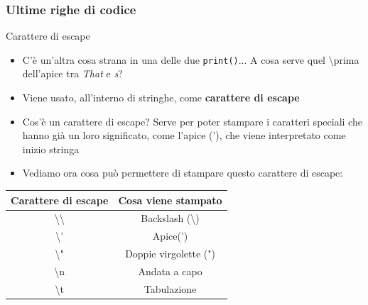 \documentclass{beamer}
\begin{document}
\begin{frame}[fragile]
\frametitle{Ultime righe di codice}
	\begin{block}{Carattere di escape}
	\begin{itemize}
		\item C'è un'altra cosa strana in una delle due \texttt{print()}... A cosa serve quel \textbackslash prima dell'apice tra \textit{That} e \textit{s}?
		\item Viene usato, all'interno di stringhe, come \textbf{carattere di escape}
		\item Cos'è un carattere di escape? Serve per poter stampare i caratteri speciali che hanno già un loro significato, come l'apice ('), che viene interpretato come inizio stringa
		\item Vediamo ora cosa può permettere di stampare questo carattere di escape:
	\end{itemize}
\end{block}
\begin{center}
\begin{tabular}{ c  c }
	\hline
	Carattere di escape & Cosa viene stampato \\ 
	\hline
	\textbackslash \textbackslash & Backslash (\textbackslash)  \\
	\textbackslash ' & Apice(') \\
	\textbackslash " & Doppie virgolette (")\\  
	\textbackslash n & Andata a capo\\
	\textbackslash t & Tabulazione 
\end{tabular}
\end{center}
\end{frame}
\end{document}
